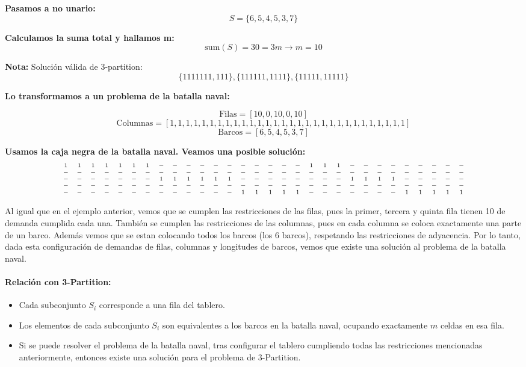 \textbf{Pasamos a no unario:}
\[
S = \{6, 5, 4, 5, 3, 7\}
\]

\textbf{Calculamos la suma total y hallamos m:}
\[
\text{sum}(S) = 30 = 3m \rightarrow m = 10
\]

\textbf{Nota:} Solución válida de 3-partition:
\[
    \{1111111, 111\}, \{111111, 1111\}, \{11111, 11111\}
\]

\textbf{Lo transformamos a un problema de la batalla naval:}

\[
\text{Filas} = [10, 0, 10, 0, 10]
\]
\[
\text{Columnas} = [1, 1, 1, 1, 1, 1, 1, 1, 1, 1, 1, 1, 1, 1, 1, 1, 1, 1, 1, 1, 1, 1, 1, 1, 1, 1, 1, 1, 1, 1]
\]
\[
\text{Barcos} = [6, 5, 4, 5, 3, 7]
\]

\textbf{Usamos la caja negra de la batalla naval. Veamos una posible solución:}
\[
\scriptsize
\begin{array}{cccccccccccccccccccccccccccccc}
1 & 1 & 1 & 1 & 1 & 1 & 1 & - & - & - & - & - & - & - & - & - & - & - & 1 & 1 & 1 & - & - & - & - & - & - & - & - & - \\
- & - & - & - & - & - & - & - & - & - & - & - & - & - & - & - & - & - & - & - & - & - & - & - & - & - & - & - & - & - \\
- & - & - & - & - & - & - & 1 & 1 & 1 & 1 & 1 & 1 & - & - & - & - & - & - & - & - & 1 & 1 & 1 & 1 & - & - & - & - & - \\
- & - & - & - & - & - & - & - & - & - & - & - & - & - & - & - & - & - & - & - & - & - & - & - & - & - & - & - & - & - \\
- & - & - & - & - & - & - & - & - & - & - & - & - & 1 & 1 & 1 & 1 & 1 & - & - & - & - & - & - & - & 1 & 1 & 1 & 1 & 1 \\
\end{array}
\]

Al igual que en el ejemplo anterior, vemos que se cumplen las restricciones de las filas, pues la primer, tercera y quinta fila tienen 10 de demanda cumplida cada una.
También se cumplen las restricciones de las columnas, pues en cada columna se coloca exactamente una parte de un barco.
Además vemos que se estan colocando todos los barcos (los 6 barcos), respetando las restricciones de adyacencia.
Por lo tanto, dada esta configuración de demandas de filas, columnas y longitudes de barcos, vemos que existe una solución al problema de la batalla naval.

\paragraph{Relación con 3-Partition:}
\begin{itemize}
    \item Cada subconjunto \(S_i\) corresponde a una fila del tablero. 
    \item Los elementos de cada subconjunto \(S_i\) son equivalentes a los barcos en la batalla naval, ocupando exactamente \(m\) celdas en esa fila.
    \item Si se puede resolver el problema de la batalla naval, tras configurar el tablero cumpliendo todas las restricciones mencionadas anteriormente, entonces existe una solución para el problema de \(3\)-Partition.
\end{itemize}

